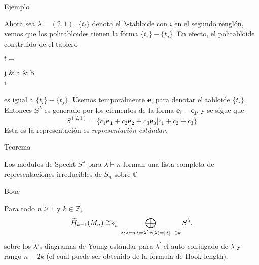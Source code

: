 \documentclass[final,xcolor=svgnames]{beamer}
\begin{document}
\begin{frame}{}
\begin{columns}
\begin{column}{0.5\textwidth}
\begin{block}{Ejemplo}
\begin{scriptsize}
         Ahora sea $\lambda=(2,1)$, $\{t_{i}\}$ denota el $\lambda$-tabloide
         con $i$ en el segundo renglón, vemos que los politabloides tienen la
         forma  $\{t_{i}\}- \{t_{j}\}$. En efecto, el politabloide construido
         de el tablero
         \begin{center}$t=$
           \begin{ytableau}
             j & a & b \\
             i\\
           \end{ytableau}
         \end{center}
         es igual a $\{t_{i}\}- \{t_{j}\}$. Usemos temporalmente
         $\boldsymbol{e_{i}}$ para denotar el tabloide $\{t_{i}\}$. Entonces
         $S^{\lambda}$ es generado por los elementos de la forma
         $\boldsymbol{e_{i}}-\boldsymbol{e_{j}}$, y se sigue que
         $$S^{(2,1)}=\{c_{1}\boldsymbol{e_{1}}+c_{2}\boldsymbol{e_{2}}+c_{3}\boldsymbol{e_{3}}|c_{1}+c_{2}+c_{3}\}$$ 
         Esta es la representación es \textit{representación estándar}. 
       \end{scriptsize}
     \end{block}

     \begin{block}{Teorema}
       \begin{scriptsize}         
         Los módulos de Specht $S^{\lambda}$ para $\lambda\vdash n$ forman
         una lista completa de representaciones irreducibles de $S_{n}$ sobre $\mathbb{C}$
        \end{scriptsize}
      \end{block}

      \begin{block}{Bouc}
        \begin{scriptsize}
          Para todo $n\geq1$ y $k\in \mathbb{Z}$,
          \begin{equation*}
            \widetilde H_{k-1}(M_{n})\cong_{S_{n}}\bigoplus_{\lambda:\lambda\vdash n\\
              \lambda=\lambda^{'}\\r(\lambda)=\mid \lambda \mid-2k} S^{\lambda}.
          \end{equation*}
          sobre los $\lambda$'s diagramas de Young estándar para $\lambda^{'}$
          el auto-conjugado de $\lambda$ y rango $n-2k$ (el cual puede ser
          obtenido de la fórmula de Hook-length).
        \end{scriptsize}
      \end{block}
    \end{column}
  \end{columns}


\end{frame}
\end{document}
